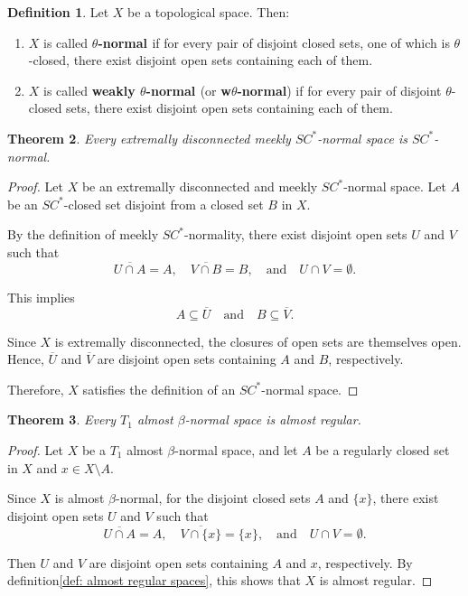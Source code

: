 \documentclass[12pt,a4paper,twoside]{report}  %
\theoremstyle{plain}
\newtheorem{theorem}{Theorem}[section]
\theoremstyle{definition}
\newtheorem{definition}[theorem]{Definition}
\begin{document}
\begin{definition}
Let $X$ be a topological space. Then:

\begin{enumerate}[label=(\roman*)]
    \item $X$ is called \textbf{$\theta$-normal \cite{kohli2002new}} if for every pair of disjoint closed sets, one of which is $\theta$-closed, there exist disjoint open sets containing each of them.
    
    \item $X$ is called \textbf{weakly $\theta$-normal \cite{kohli2002new}} (or \textbf{w$\theta$-normal}) if for every pair of disjoint $\theta$-closed sets, there exist disjoint open sets containing each of them.
\end{enumerate}
\end{definition}

\begin{theorem}
Every extremally disconnected meekly $SC^*$-normal space is $SC^*$-normal.
\end{theorem}

\begin{proof}
Let $X$ be an extremally disconnected and meekly $SC^*$-normal space.  
Let $A$ be an $SC^*$-closed set disjoint from a closed set $B$ in $X$.  

By the definition of meekly $SC^*$-normality, there exist disjoint open sets $U$ and $V$ such that
\[
\overline{U \cap A} = A, \quad \overline{V \cap B} = B, \quad \text{and} \quad U \cap V = \emptyset.
\]

This implies
\[
A \subseteq \overline{U} \quad \text{and} \quad B \subseteq \overline{V}.
\]

Since $X$ is extremally disconnected, the closures of open sets are themselves open. Hence, $\overline{U}$ and $\overline{V}$ are disjoint open sets containing $A$ and $B$, respectively.  

Therefore, $X$ satisfies the definition of an $SC^*$-normal space.
\end{proof}


\begin{theorem}\cite{das2017simultaneous} \label{thm:1.5.9}
Every $T_1$ almost $\beta$-normal space is almost regular.
\end{theorem}

\begin{proof}
Let $X$ be a $T_1$ almost $\beta$-normal space, and let $A$ be a regularly closed set in $X$ and $x \in X \setminus A$.  

Since $X$ is almost $\beta$-normal\cite{das2017simultaneous}, for the disjoint closed sets $A$ and $\{x\}$, there exist disjoint open sets $U$ and $V$ such that
\[
\overline{U \cap A} = A, \quad \overline{V \cap \{x\}} = \{x\}, \quad \text{and} \quad U \cap V = \emptyset.
\]

Then $U$ and $V$ are disjoint open sets containing $A$ and $x$, respectively. By definition\ref{def: almost regular spaces}, this shows that $X$ is almost regular\cite{singal1969almost}.
\end{proof}
\end{document}
